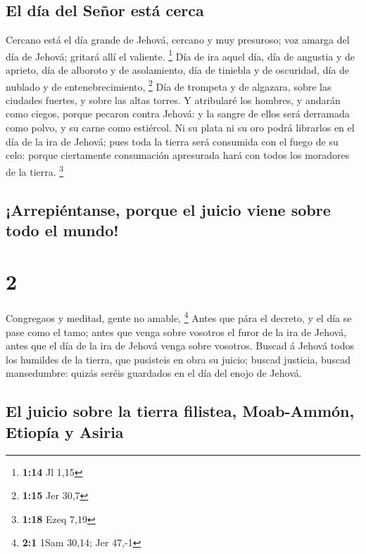 \hypertarget{el-duxeda-del-seuxf1or-estuxe1-cerca}{%
\subsection{El día del Señor está
cerca}\label{el-duxeda-del-seuxf1or-estuxe1-cerca}}

 Cercano está el día grande de Jehová, cercano y muy
presuroso; voz amarga del día de Jehová; gritará allí el valiente.
\footnote{\textbf{1:14} Jl 1,15}  Día de ira aquel día,
día de angustia y de aprieto, día de alboroto y de asolamiento, día de
tiniebla y de oscuridad, día de nublado y de entenebrecimiento,
\footnote{\textbf{1:15} Jer 30,7}  Día de trompeta y de
algazara, sobre las ciudades fuertes, y sobre las altas torres.
 Y atribularé los hombres, y andarán como ciegos, porque
pecaron contra Jehová: y la sangre de ellos será derramada como polvo, y
su carne como estiércol.  Ni su plata ni su oro podrá
librarlos en el día de la ira de Jehová; pues toda la tierra será
consumida con el fuego de su celo: porque ciertamente consumación
apresurada hará con todos los moradores de la tierra. \footnote{\textbf{1:18}
  Ezeq 7,19}

\hypertarget{arrepiuxe9ntanse-porque-el-juicio-viene-sobre-todo-el-mundo}{%
\subsection{¡Arrepiéntanse, porque el juicio viene sobre todo el
mundo!}\label{arrepiuxe9ntanse-porque-el-juicio-viene-sobre-todo-el-mundo}}

\hypertarget{section-1}{%
\section{2}\label{section-1}}

 Congregaos y meditad, gente no amable, \footnote{\textbf{2:1}
  1Sam 30,14; Jer 47,-1}  Antes que pára el decreto, y el
día se pase como el tamo; antes que venga sobre vosotros el furor de la
ira de Jehová, antes que el día de la ira de Jehová venga sobre
vosotros.  Buscad á Jehová todos los humildes de la
tierra, que pusisteis en obra su juicio; buscad justicia, buscad
mansedumbre: quizás seréis guardados en el día del enojo de Jehová.

\hypertarget{el-juicio-sobre-la-tierra-filistea-moab-ammuxf3n-etiopuxeda-y-asiria}{%
\subsection{El juicio sobre la tierra filistea, Moab-Ammón, Etiopía y
Asiria}\label{el-juicio-sobre-la-tierra-filistea-moab-ammuxf3n-etiopuxeda-y-asiria}}

